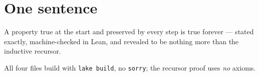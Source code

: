 \documentclass[11pt]{article}
\begin{document}
\section*{One sentence}

\begin{center}
\begin{tcolorbox}[colback=soft,colframe=ink,width=0.92\linewidth,arc=3pt]
\centering
A property true at the start and preserved by every step is true forever ---
stated exactly, machine-checked in Lean, and revealed to be nothing more than
the inductive recursor.
\end{tcolorbox}
\end{center}

\begin{center}\footnotesize
All four files build with \texttt{lake build}, no \texttt{sorry}; the recursor
proof uses \emph{no} axioms.
\end{center}
\end{document}
